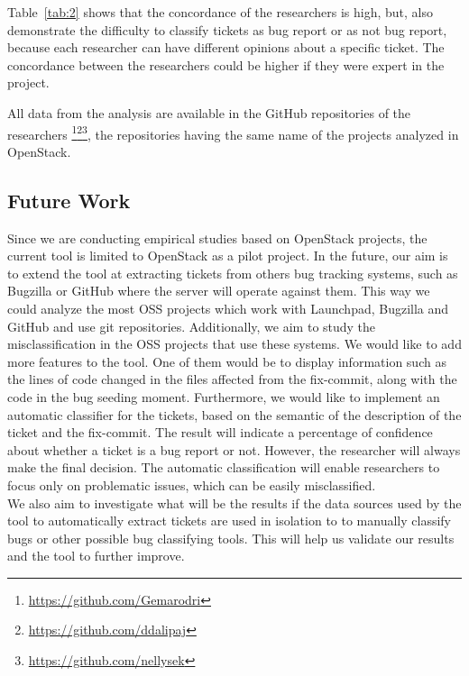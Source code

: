 \documentclass[runningheads,a4paper]{llncs}
\begin{document}
Table~\ref{tab:2} shows that the concordance of the researchers is high, but, also demonstrate the difficulty to classify tickets as bug report or as not bug report, because each researcher can have different opinions about a specific ticket. The concordance between the researchers could be higher if they were expert in the project.
 
All data from the analysis are available in the GitHub repositories of the researchers \footnote{\url{https://github.com/Gemarodri}}\footnote{\url{https://github.com/ddalipaj}}\footnote{\url{https://github.com/nellysek}}, the repositories having the same name of the projects analyzed in OpenStack.

\subsection{Future Work}
\label{sec:5.1}

Since we are conducting empirical studies based on OpenStack projects, the current tool is limited to OpenStack as a pilot project. In the future, our aim is to extend the tool at extracting tickets from others bug tracking systems, such as Bugzilla or GitHub where the server will operate against them. This way we could analyze the most OSS projects which work with Launchpad, Bugzilla and GitHub and use git repositories. Additionally, we aim to study the misclassification in the OSS projects that use these systems. We would like to add more features to the tool. One of them would be to display information such as the lines of code changed in the files affected from the fix-commit, along with the code in the bug seeding moment. Furthermore, we would like to implement an automatic classifier for the tickets, based on the semantic of the description of the ticket and the fix-commit. The result will indicate a percentage of confidence about whether a ticket is a bug report or not. However, the researcher will always make the final decision. The automatic classification will enable researchers to focus only on problematic issues, which can be easily misclassified. \\

We also aim to investigate what will be the results if the data sources used by the tool to automatically extract tickets are used in isolation to to manually classify bugs or other possible bug classifying tools. This will help us validate our results and the tool to further improve.\\
\end{document}
